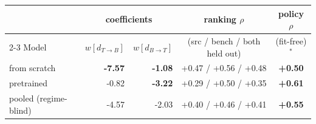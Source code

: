 \begin{tabular}{l rr c c}
\toprule
 & \multicolumn{2}{c}{coefficients} & ranking $\rho$ & policy $\rho$ \\
\cmidrule(lr){2-3}
Model & $w[d_{T\to B}]$ & $w[d_{B\to T}]$ & (src / bench / both held out) & (fit-free)$^{*}$ \\
\midrule
from scratch & \textbf{-7.57} & \textbf{-1.08} & +0.47 / +0.56 / +0.48 & \textbf{+0.50} \\
pretrained & -0.82 & \textbf{-3.22} & +0.29 / +0.50 / +0.35 & \textbf{+0.61} \\
pooled (regime-blind) & -4.57 & -2.03 & +0.40 / +0.46 / +0.41 & \textbf{+0.55} \\
\bottomrule
\end{tabular}
